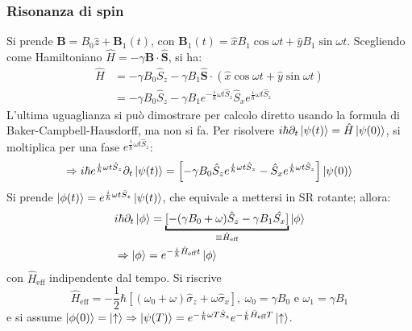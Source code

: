 \documentclass[11pt, a4paper]{scrartcl} %
\numberwithin{equation}{subsection}
\theoremstyle{style2}
\theoremstyle{style1}
\begin{document}
\subsubsection{Risonanza di spin}
Si prende $\mathbf{B}  = B_0 \hat{z} + \mathbf{B} _1 (t)$, con $\mathbf{B} _1(t) = \hat{x}B_1\cos \omega t + \hat{y} B_1 \sin \omega t$. 
Scegliendo come Hamiltoniano $\hat{H}= - \gamma \mathbf{B} \cdot \hat{\mathbf{S} }$, si ha:
\begin{equation}
	\begin{split}
		\hat{H} &= -\gamma B_0 \hat{S}_z - \gamma B_1 \hat{\mathbf{S} }\cdot  ( \hat{x} \cos \omega t + \hat{y} \sin  \omega t)\\
			&= - \gamma B_0 \hat{S}_z - \gamma B_1 e^{ - \frac{i}{\hbar }\omega t \hat{S}_z}  \hat{S}_x e^{\frac{i}{\hbar }\omega t \hat{S}_z} 
	\end{split}
\end{equation}
L'ultima uguaglianza si pu\`o dimostrare per calcolo diretto usando la formula di Baker-Campbell-Hausdorff, ma non si fa. Per risolvere $i\hbar  \partial _t \ket{\psi (t)}  = \hat{H}\ket{\psi (0)} $, si moltiplica per una fase $e^{ \frac{i}{\hbar }\omega t \hat{S}_z} $:
\[
\Rightarrow i\hbar e^{\frac{i}{\hbar }\omega t \hat{S}_z} \partial _t \ket{\psi (t)}  = \left[ - \gamma B_0 \hat{S}_z e^{\frac{i}{\hbar }\omega t \hat{S}_z}  - \hat{S}_x e^{\frac{i}{\hbar }\omega t \hat{S}_z} \right] \ket{\psi (0)} 
\] 
Si prende $\ket{\phi (t)} = e^{\frac{i}{\hbar }\omega t \hat{S}_z} \ket{\psi (t)} $, che equivale a mettersi in SR rotante; allora:
\begin{equation}
	\begin{split}
		&i\hbar  \partial _t \ket{\phi } = \underbracket{[- (\gamma B_0 + \omega)\hat{S}_z - \gamma B_1 \hat{S_x}]}_{\equiv \hat{H}_\text{eff}} \ket{\phi } \\
		&\Rightarrow \ket{\phi } = e^{ -\frac{i}{\hbar }\hat{H}_\text{eff}t} \ket{\phi } 
	\end{split}
\end{equation}
con $\hat{H}_\text{eff}$ indipendente dal tempo. Si riscrive
\begin{equation}
	\hat{H}_\text{eff} = - \frac{1}{2} \hbar \left[ (\omega_0 + \omega) \hat{\sigma }_z + \omega \hat{\sigma }_x \right] , \ \omega_0 = \gamma B_0 \text{ e } \omega _1 = \gamma B_1
\end{equation}
e si assume $\ket{\phi (0)} = \ket{\uparrow} \Rightarrow \ket{\psi (T)} = e^{- \frac{i}{\hbar }\omega T \hat{S}_z} e^{- \frac{i}{\hbar } \hat{H}_\text{eff}T} \ket{\uparrow}  $.
\end{document}
